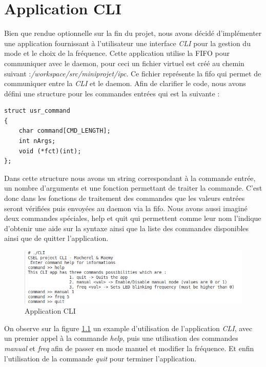 \documentclass{ReportTemplate}
\begin{document}
\chapter{Application CLI}
Bien que rendue optionnelle sur la fin du projet, nous avons décidé
d'implémenter une application fournissant à l'utilisateur une interface \textit{CLI} pour
la gestion du mode et le choix de la fréquence.\newline
Cette application utilise la FIFO pour communiquer avec le daemon, pour ceci un
fichier virtuel est créé au chemin suivant
:\textit{/workspace/src/miniprojet/ipc}. Ce fichier représente la fifo qui
permet de communiquer entre la \textit{CLI} et le daemon.\newline
Afin de clarifier le code, nous avons défini une structure pour les commandes
entrées qui est la suivante :
\begin{verbatim}
struct usr_command
{
    char command[CMD_LENGTH];
    int nArgs;
    void (*fct)(int);
};
\end{verbatim}
Dans cette structure nous avons un string correspondant à la commande entrée, un
nombre d'arguments et une fonction permettant de traiter la commande.\newline
C'est donc dans les fonctions de traitement des commandes que les valeurs
entrées seront vérifiées puis envoyées au daemon via la fifo. Nous avons aussi
imaginé deux commandes spéciales, help et quit qui permettent comme leur nom
l'indique d'obtenir une aide sur la syntaxe ainsi que la liste des commandes
disponibles ainsi que de quitter l'application.
\begin{figure}[H]
    \centering
    \includegraphics[width=\textwidth]{imageSources/Cli_Example.png}
    \caption{Application CLI}
    \label{fig:CLIApp}
\end{figure}
On observe sur la figure \ref{fig:CLIApp} un example d'utilisation de
l'application \textit{CLI}, avec un premier appel à la commande \textit{help}, puis une
utilisation des commandes \textit{manual} et \textit{freq} afin de passer en
mode manuel et modifier la fréquence. Et enfin l'utilisation de la commande
\textit{quit} pour terminer l'application.
\end{document}
